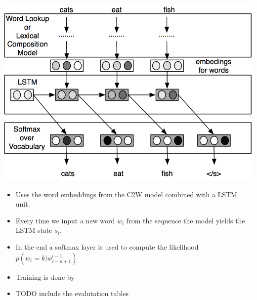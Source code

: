 \documentclass[11pt, a4paper, landscape]{article}
\begin{document}
\vfill
\begin{minipage}[b]{.4\linewidth}
  \begin{center}
    \includegraphics[width=\linewidth]{../article/img/c2w-language-model}
  \end{center}
\end{minipage}
\begin{minipage}[b]{.6\linewidth}
  \begin{itemize}
  \item Uses the word embeddings from the C2W model combined with a LSTM unit.
  \item Every time we input a new word $w_i$ from the sequence the model yields the LSTM state $s_i$.
  \item In the end a softmax layer is used to compute the likelihood $p(w_i = k | w_{i-n+1}^{i-1})$
  \end{itemize}
\end{minipage}
\vfill

\NewPage{}

\vfill
\begin{itemize}
\item Training is done by
\end{itemize}
\vfill

\NewPage{}

\vfill
\begin{itemize}
\item TODO include the evalutation tables
\end{itemize}
\vfill
\end{document}
